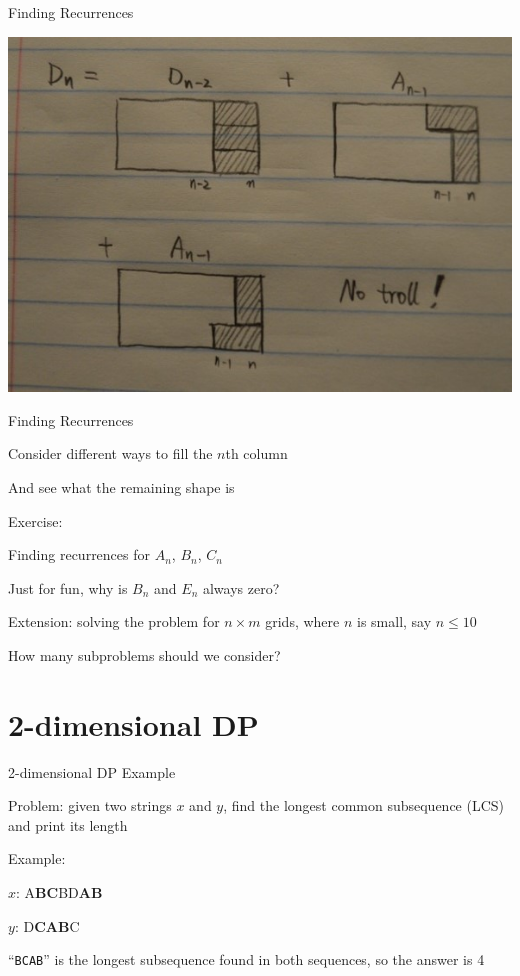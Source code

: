 \documentclass[13pt,onlymath]{beamer}
\begin{document}
\begin{frame}{Finding Recurrences}
\begin{center}
\includegraphics[height=0.7\textheight]{figures/tritiling_sub2.jpg}
\end{center}
\end{frame}

\begin{frame}{Finding Recurrences}
\BIT
\item Consider different ways to fill the $n$th column
\BIT \item And see what the remaining shape is \EIT
\item Exercise:
\BIT
\item Finding recurrences for $A_n$, $B_n$, $C_n$
\item Just for fun, why is $B_n$ and $E_n$ always zero?
\EIT
\vfill
\item Extension: solving the problem for $n \times m$ grids, where $n$ is small, say $n \le 10$
\BIT \item How many subproblems should we consider? \EIT
\EIT
\end{frame}

\section{2-dimensional DP}

\begin{frame}[fragile]{2-dimensional DP Example}
\BIT
\item Problem: given two strings $x$ and $y$, find the longest common subsequence (LCS) and print its length
\item Example:
\BIT
\item $x$: {\ttfamily A{\bfseries BC}BD{\bfseries AB}}
\item $y$: {D{\bfseries CAB}C}
\item ``\texttt{BCAB}'' is the longest subsequence found in both sequences, so the answer is 4
\EIT
\EIT
\end{frame}
\end{document}
